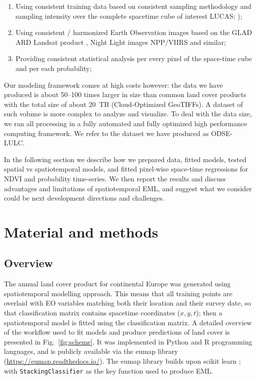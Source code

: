 \begin{enumerate}
    \item Using consistent training data based on consistent sampling methodology and sampling intensity over the complete spacetime cube of interest LUCAS; \citet{d2020harmonised});
    \item Using consistent / harmonized Earth Observation images based on the GLAD ARD Landsat product \citep{potapov2020landsat}, Night Light images NPP/VIIRS \citep{roman2018nasa} and similar;
    \item Providing consistent statistical analysis per every pixel of the space-time cube and per each probability;
\end{enumerate}

Our modeling framework comes at high costs however: the data we have produced is about 50--100 times larger in size than common land cover products with the total size of about 20~TB (Cloud-Optimized GeoTIFFs). A dataset of such volume is more complex to analyze and visualize. To deal with the data size, we ran all processing in a fully automated and fully optimized high performance computing framework. We refer to the dataset we have produced as ODSE-LULC.

In the following section we describe how we prepared data, fitted models, tested spatial vs spatiotemporal models, and fitted pixel-wise space-time regressions for NDVI and probability time-series. We then report the results and discuss advantages and limitations of spatiotemporal EML, and suggest what we consider could be next development directions and challenges.

\section{Material and methods}

\subsection*{Overview}

    The annual land cover product for continental Europe was generated using spatiotemporal modelling approach. This means that all training points are overlaid with EO variables matching both their location and their survey date, so that classification matrix contains spacetime coordinates ($x,y,t$); then a spatiotemporal model is fitted using the classification matrix. A detailed overview of the workflow used to fit models and produce predictions of land cover is presented in Fig.\@~\ref{fig:scheme}. It was implemented in Python and R programming languages, and is publicly available via the \textsf{eumap} library (\url{https://eumap.readthedocs.io/}). The \textsf{eumap} library builds upon \textsf{scikit learn} \citep{pedregosa2011scikit,geron2019hands}; with \verb"StackingClassifier" as the key function used to produce EML. 

